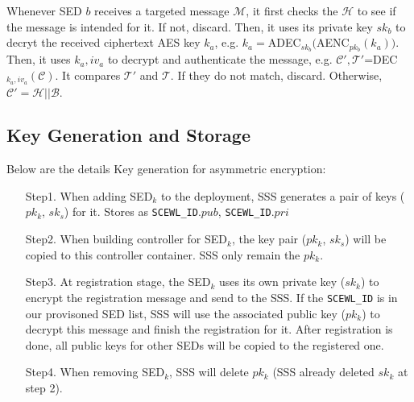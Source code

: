 \documentclass[11pt,oneside,onecolumn,letterpaper]{article}
\begin{document}
Whenever SED $b$ receives a targeted message $\mathcal{M}$, it first checks the $\mathcal{H}$ to see if the message is intended for it. If not, discard.
Then, it uses its private key $sk_b$ to decryt the received ciphertext AES key $k_a$, e.g. $k_a=$ADEC$_{sk_b}($AENC$_{pk_b}(k_a))$.
Then, it uses $k_a, iv_a$ to decrypt and authenticate the message, e.g. $\mathcal{C'}, \mathcal{T'}$=DEC$_{k_a, iv_a}(\mathcal{C})$.
It compares $\mathcal{T'}$ and $\mathcal{T}$.
If they do not match, discard.
Otherwise, $\mathcal{C'}=\mathcal{H}||\mathcal{B}$.

\subsection{Key Generation and Storage}

Below are the details Key generation for asymmetric encryption:
\begin{itemize}
  \item[Step1. ] When adding SED$_k$ to the deployment, SSS generates a pair of keys ($pk_k$, $sk_s$) for it.
  Stores as \verb|SCEWL_ID|.$pub$, \verb|SCEWL_ID|.$pri$
  \item[Step2. ] When building controller for SED$_k$, the key pair ($pk_k$, $sk_s$) will be copied to this controller container.
  SSS only remain the $pk_k$. 
  \item[Step3. ] At registration stage, the SED$_k$ uses its own private key ($sk_k$) to encrypt the registration message and send to the SSS.
  If the \verb|SCEWL_ID| is in our provisoned SED list, SSS will use the associated public key ($pk_k$) to decrypt this message and finish the registration for it.
  After registration is done, all public keys for other SEDs will be copied to the registered one.
  \item[Step4. ] When removing SED$_k$, SSS will delete $pk_k$ (SSS already deleted $sk_k$ at step 2).
\end{itemize}
\end{document}
